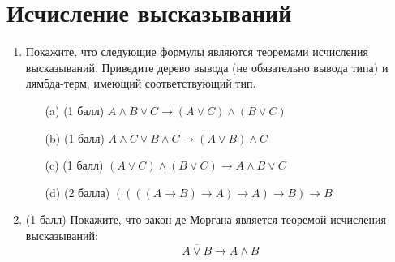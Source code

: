\section{Исчисление высказываний}
\begin{enumerate}
  \item Покажите, что следующие формулы являются теоремами исчисления высказываний. Приведите дерево вывода (не обязательно вывода типа) и лямбда-терм, имеющий соответствующий тип.
  \begin{itemize}
    \item[(a)] (1 балл) $A \land B \lor C \rightarrow (A \lor C) \land (B \lor C)$
    \item[(b)] (1 балл) $A \land C \lor B \land C \rightarrow (A \lor B) \land C$
    \item[(c)] (1 балл) $(A \lor C) \land (B \lor C) \rightarrow A \land B \lor C$
    \item[(d)] (2 балла) $((((A \rightarrow B) \rightarrow A) \rightarrow A) \rightarrow B) \rightarrow B$
  \end{itemize}
  \item (1 балл) Покажите, что закон де Моргана является теоремой исчисления высказываний:
  $$\overline{A \lor B} \rightarrow A \land B$$
\end{enumerate}
\clearpage

